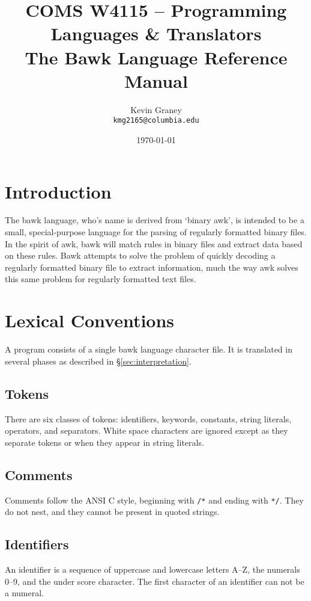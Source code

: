 \documentclass[letterpaper]{article}
\title{
	{\large COMS W4115 -- Programming Languages \& Translators}\\
	The Bawk Language Reference Manual}
\author{Kevin Graney\\
	\texttt{kmg2165@columbia.edu}}
\date{\today}
\begin{document}
\maketitle
\tableofcontents

\section{Introduction}
The bawk language, who's name is derived from `binary awk', is intended to be a small, special-purpose language for the parsing of regularly formatted binary files.  In the spirit of awk, bawk will match rules in binary files and extract data based on these rules.  Bawk attempts to solve the problem of quickly decoding a regularly formatted binary file to extract information, much the way awk solves this same problem for regularly formatted text files.



\section{Lexical Conventions}
A program consists of a single bawk language character file.  It is translated in several phases as described in \S\ref{sec:interpretation}.

\subsection{Tokens}
There are six classes of tokens: identifiers, keywords, constants, string literals, operators, and separators.  White space characters are ignored except as they separate tokens or when they appear in string literals.

\subsection{Comments}
Comments follow the ANSI C style, beginning with \texttt{/*} and ending with \texttt{*/}.  They do not nest, and they cannot be present in quoted strings.

\subsection{Identifiers}
\label{sec:identifiers}
An identifier is a sequence of uppercase and lowercase letters A--Z, the numerals 0--9, and the under score character.  The first character of an identifier can not be a numeral.
\end{document}

